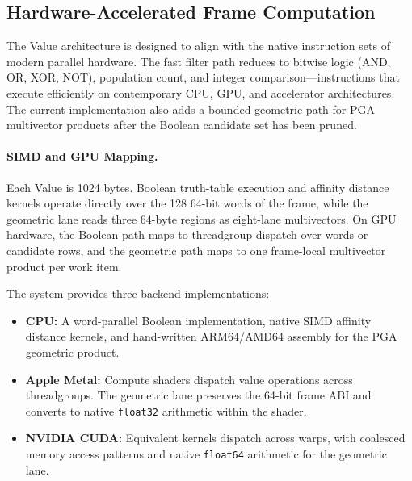 \subsection{Hardware-Accelerated Frame Computation}
\label{sec:related_hardware_accel}

The Value architecture is designed to align with the native instruction
sets of modern parallel hardware.  The fast filter path reduces to
bitwise logic (AND, OR, XOR, NOT), population count, and integer
comparison---instructions that execute efficiently on contemporary CPU,
GPU, and accelerator architectures.  The current implementation also
adds a bounded geometric path for PGA multivector products after the
Boolean candidate set has been pruned.

\paragraph{SIMD and GPU Mapping.}
Each Value is 1024 bytes.  Boolean truth-table execution and affinity
distance kernels operate directly over the 128 64-bit words of the
frame, while the geometric lane reads three 64-byte regions as
eight-lane multivectors.  On GPU hardware, the Boolean path maps to
threadgroup dispatch over words or candidate rows, and the geometric
path maps to one frame-local multivector product per work item.

The system provides three backend implementations:

\begin{itemize}[nosep]
  \item \textbf{CPU:} A word-parallel Boolean implementation, native
        SIMD affinity distance kernels, and hand-written ARM64/AMD64
        assembly for the PGA geometric product.
  \item \textbf{Apple Metal:} Compute shaders dispatch value operations
        across threadgroups.  The geometric lane preserves the 64-bit
        frame ABI and converts to native \texttt{float32} arithmetic
        within the shader.
  \item \textbf{NVIDIA CUDA:} Equivalent kernels dispatch across warps,
        with coalesced memory access patterns and native \texttt{float64}
        arithmetic for the geometric lane.
\end{itemize}

